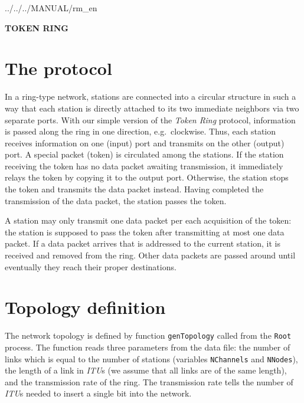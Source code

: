  {../../../MANUAL/rm_en}



\begin{titlepage}

\vspace*{3.5in}
\begin{center}
\Huge\bf TOKEN RING \vspace{0.25in}
\end{center}
\end{titlepage}

\section{The protocol}

In a ring-type network, stations are connected into a circular structure
in such a way that each station is directly attached to its two immediate
neighbors via two separate ports.
With our simple version of the {\em Token Ring\/} protocol,
information is passed along
the ring in one direction, e.g.\ 
clockwise.
Thus, each station receives information on one
(input) port and transmits on the other (output) port.
A special packet (token) is circulated among the stations.
If the station receiving the token has
no data packet awaiting transmission, it immediately relays the
token by copying it to the output port.
Otherwise, the station stops the token and transmits the
data packet instead.
Having completed the transmission of the data packet,
the station passes the token.

A
station may only transmit one data packet per each acquisition of the token:
the station is supposed to pass the token after transmitting at most one data
packet.
If a data packet arrives that is addressed to the current station,
it is received and removed from the ring.
Other data packets are passed around until eventually they
reach their proper destinations.

\section{Topology definition}

The network topology is defined by function {\tt genTopology} called from the
{\tt Root} process.
The function reads three parameters from the data file:
the number of links which is
equal to the number of stations (variables {\tt NChannels} and
{\tt NNodes}), the length of a link in {\em ITU\/}s
(we assume that all links are of the same length), and the transmission
rate of the ring.
The transmission rate tells the number of {\em ITU\/}s needed to insert a
single bit into the network.

